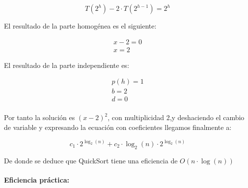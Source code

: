 \documentclass[a4paper,12pt]{article} %
\begin{document}
\begin{equation*}
	T(2^{h}) - 2\cdot T(2^{h-1}) = 2^{h}
\end{equation*}

El resultado de la parte homogénea es el siguiente:

\begin{align*}
	x - 2 = 0 \\
	x = 2
\end{align*}

El resultado de la parte independiente es:

\begin{align*}
	p(h) = 1 \\
	b = 2    \\
	d = 0    \\
\end{align*}

Por tanto la solución es $(x-2)^2$, con multiplicidad 2,y deshaciendo el
cambio de variable y expresando la ecuación con coeficientes llegamos finalmente
a:

\begin{equation*}
	c_{1}\cdot 2^{\log _{2}(n)} + c_{2}\cdot \log_{2}(n)\cdot 2^{\log_{2}(n)}
\end{equation*}

De donde se deduce que QuickSort tiene una eficiencia de $O(n\cdot \log(n))$
\\

\paragraph{Eficiencia práctica:}
\end{document}
